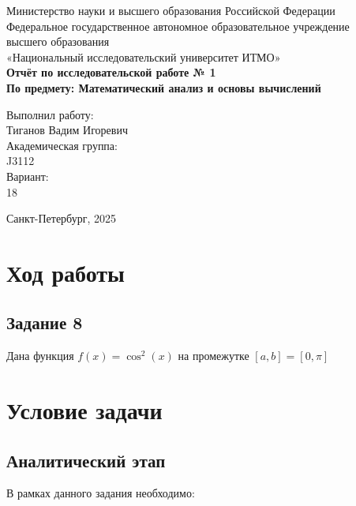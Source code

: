 \documentclass[a4paper,12pt]{article}
\begin{document}
\thispagestyle{empty}
\begin{center}
    \large
    Министерство науки и высшего образования Российской Федерации\\
    Федеральное государственное автономное образовательное учреждение\\
    высшего образования\\
    «Национальный исследовательский университет ИТМО»\\
    \vspace{5cm}
    \textbf{Отчёт по исследовательской работе № 1}\\
    \textbf{По предмету: Математический анализ и основы вычислений}\\
    \vspace{6cm}
    \begin{flushright}
        Выполнил работу:\\ Тиганов Вадим Игоревич\\
        \vspace{1cm}
        Академическая группа: \\ J3112\\
        \vspace{1cm}
        Вариант: \\18
    \end{flushright}
    \vspace{1cm}
    \vspace{3cm}
    \begin{center}
        Санкт-Петербург, 2025\\
    \end{center}
\end{center}

\newpage


\section{Ход работы}


\subsection{Задание 8}

Дана функция \(f(x) = \cos^2(x)\) на промежутке \([a,b] = [0, \pi]\)

\section*{Условие задачи}

\subsection*{Аналитический этап}
В рамках данного задания необходимо:
\end{document}
